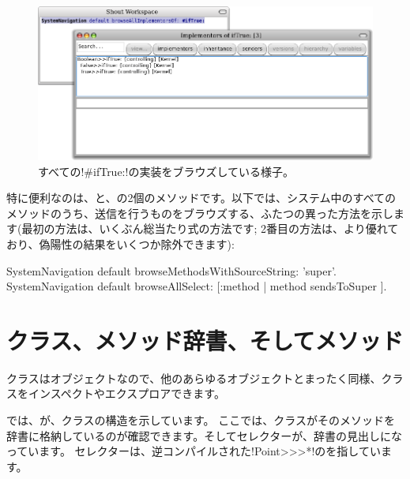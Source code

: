 \documentclass[a4paper,10pt,twoside]{book}
\begin{document}
\begin{figure}[ht]\centering
	\includegraphics[width=\linewidth]{implementors}
	\caption{すべての\ct!\#ifTrue:!の実装をブラウズしている様子。}
\end{figure}

特に便利なのは、と、の2個のメソッドです。以下では、システム中のすべてのメソッドのうち、\super 送信を行うものをブラウズする、ふたつの異った方法を示します(最初の方法は、いくぶん総当たり式の方法です; 2番目の方法は、より優れており、偽陽性の結果をいくつか除外できます): %
\begin{code}{}
SystemNavigation default browseMethodsWithSourceString: 'super'.
SystemNavigation default browseAllSelect: [:method | method sendsToSuper ].
\end{code}

\section{クラス、メソッド辞書、そしてメソッド}

クラスはオブジェクトなので、他のあらゆるオブジェクトとまったく同様、クラスをインスペクトやエクスプロアできます。


では、が、クラスの構造を示しています。
ここでは、クラスがそのメソッドを辞書に格納しているのが確認できます。そしてセレクターが、辞書の見出しになっています。
\ct{#*}セレクターは、逆コンパイルされた\ct!Point>>>*!のを指しています。
\end{document}
